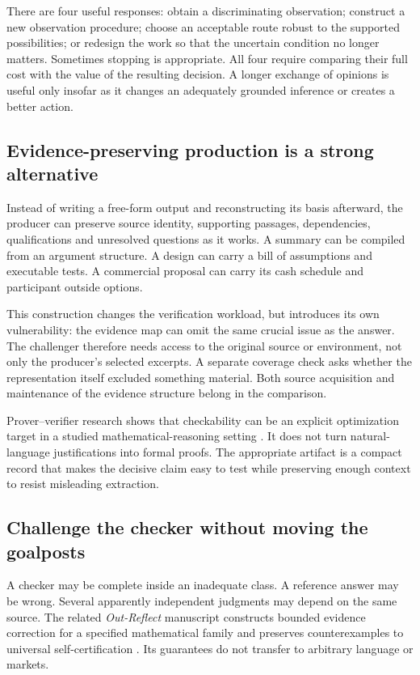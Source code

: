 There are four useful responses: obtain a discriminating observation; construct a new observation procedure; choose an acceptable route robust to the supported possibilities; or redesign the work so that the uncertain condition no longer matters. Sometimes stopping is appropriate. All four require comparing their full cost with the value of the resulting decision. A longer exchange of opinions is useful only insofar as it changes an adequately grounded inference or creates a better action.

\subsection{Evidence-preserving production is a strong alternative}
Instead of writing a free-form output and reconstructing its basis afterward, the producer can preserve source identity, supporting passages, dependencies, qualifications and unresolved questions as it works. A summary can be compiled from an argument structure. A design can carry a bill of assumptions and executable tests. A commercial proposal can carry its cash schedule and participant outside options.

This construction changes the verification workload, but introduces its own vulnerability: the evidence map can omit the same crucial issue as the answer. The challenger therefore needs access to the original source or environment, not only the producer's selected excerpts. A separate coverage check asks whether the representation itself excluded something material. Both source acquisition and maintenance of the evidence structure belong in the comparison.

Prover--verifier research shows that checkability can be an explicit optimization target in a studied mathematical-reasoning setting \citep{prover_verifier}. It does not turn natural-language justifications into formal proofs. The appropriate artifact is a compact record that makes the decisive claim easy to test while preserving enough context to resist misleading extraction.

\subsection{Challenge the checker without moving the goalposts}
A checker may be complete inside an inadequate class. A reference answer may be wrong. Several apparently independent judgments may depend on the same source. The related \emph{Out-Reflect} manuscript constructs bounded evidence correction for a specified mathematical family and preserves counterexamples to universal self-certification \citep{boucher_reflect}. Its guarantees do not transfer to arbitrary language or markets.


